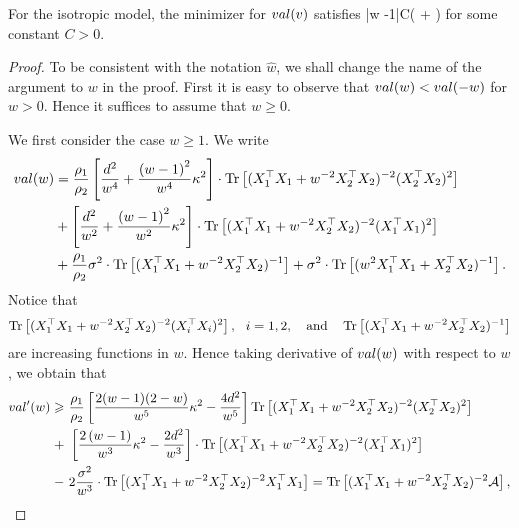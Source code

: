 \begin{lemma}\label{lem_hat_v}
For the isotropic model, the minimizer for $val(v)$ satisfies
	\be\label{hatw_add1}|\hat w -1|\le C\left( + \right)\quad {}\ee
	for some constant $C>0$.
\end{lemma}
\begin{proof}
To be consistent with the notation $\hat w$, we shall change the name of the argument to $w$ in the proof. First it is easy to observe that $val(w)< val(-w)$ for $w> 0$. Hence it suffices to assume that $w\ge 0$.

We first consider the case $w\ge 1$. We write
\begin{align}
	\val(w) &=  \frac{\rho_1}{\rho_2}\left[\frac{d^2}{w^4} +\frac{\left( w-1\right)^2}{w^4}\kappa^2\right]\cdot \tr\left[( X_1^{\top}X_1 +w^{-2}X_2^{\top}X_2)^{-2} (X_2^{\top}X_2)^2\right] \nonumber \\
	& + \left[\frac{d^2}{w^2} +\frac{\left( w-1\right)^2}{w^2}\kappa^2\right]\cdot \tr\left[( X_1^{\top}X_1 +w^{-2}X_2^{\top}X_2)^{-2} (X_1^{\top}X_1)^2\right] \nonumber\\
			& +  \frac{\rho_1}{\rho_2}\sigma^2  \cdot \bigtr{(X_1^{\top}X_1  + w^{-2}X_2^{\top}X_2)^{-1} }+ \sigma^2 \cdot \bigtr{(w^2X_1^{\top}X_1  + X_2^{\top}X_2)^{-1} }.\nonumber%
\end{align}
Notice that 
$$\operatorname{Tr}\left[( X_1^{\top}X_1 +w^{-2}X_2^{\top}X_2)^{-2} (X_i^{\top}X_i)^2\right],\ \ i=1,2, \quad \text{and} \quad \operatorname{Tr}\left[(X_1^{\top}X_1  + w^{-2}X_2^{\top}X_2)^{-1} \right]$$
are increasing functions in $w$. Hence taking derivative of $val(w)$ with respect to $w$, we obtain that
\begin{align*}
\val'(w) \ge &~  \frac{\rho_1}{\rho_2}\left[ \frac{2(w-1)(2-w)}{w^5}\kappa^2 - \frac{4d^2}{w^5}\right] \tr\left[( X_1^{\top}X_1 +w^{-2}X_2^{\top}X_2)^{-2} (X_2^{\top}X_2)^2\right]   \\
+&~ \left[\frac{2\left( w-1\right)}{w^3}\kappa^2 - \frac{2d^2}{w^3} \right]\cdot \tr\left[( X_1^{\top}X_1 +w^{-2}X_2^{\top}X_2)^{-2} (X_1^{\top}X_1)^2\right] \nonumber\\
		-&~ 2  \frac{\sigma^2}{w^3} \cdot \bigtr{(X_1^{\top}X_1 + w^{-2}X_2^{\top}X_2)^{-2} X_1^\top X_1  } =  \bigtr{(X_1^{\top}X_1 + w^{-2}X_2^{\top}X_2)^{-2} \cal A },

\end{align*}
\end{proof}
